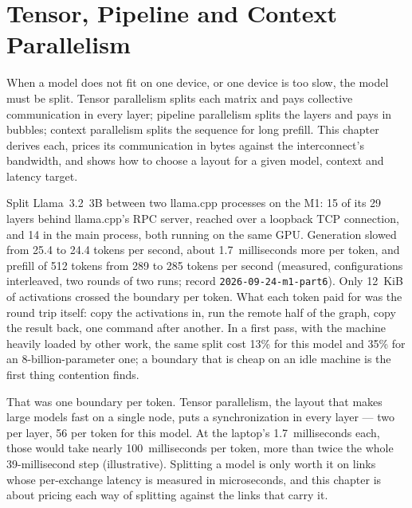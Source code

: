 \chapter{Tensor, Pipeline and Context Parallelism}\label{ch:model-parallelism}

\begin{ChapterIntent}
When a model does not fit on one device, or one device is too slow, the
model must be split. Tensor parallelism splits each matrix and pays collective
communication in every layer; pipeline parallelism splits the layers and pays
in bubbles; context parallelism splits the sequence for long prefill. This
chapter derives each, prices its communication in bytes against the
interconnect's bandwidth, and shows how to choose a layout for a given model,
context and latency target.
\end{ChapterIntent}


Split Llama~3.2~3B between two llama.cpp processes on the M1: 15 of its 29
layers behind llama.cpp's RPC server, reached over a loopback TCP connection,
and 14 in the main process, both running on the same GPU. Generation slowed
from 25.4 to 24.4 tokens per second, about 1.7~milliseconds more per token, and
prefill of 512 tokens from 289 to 285 tokens per second (measured,
configurations interleaved, two rounds of two runs; record
\texttt{2026-09-24-m1-part6}). Only 12~KiB of activations crossed the boundary
per token. What each token paid for was the round trip itself: copy the
activations in, run the remote half of the graph, copy the result back, one
command after another. In a first pass, with the machine heavily loaded by
other work, the same split cost 13\% for this model and 35\% for an
8-billion-parameter one; a boundary that is cheap on an idle machine is the
first thing contention finds.

That was one boundary per token. Tensor parallelism, the layout that makes
large models fast on a single node, puts a synchronization in every layer ---
two per layer, 56 per token for this model. At the laptop's 1.7~milliseconds
each, those would take nearly 100~milliseconds per token, more than twice the
whole 39-millisecond step (illustrative). Splitting a model is only worth it on links whose
per-exchange latency is measured in microseconds, and this chapter is about
pricing each way of splitting against the links that carry it.

